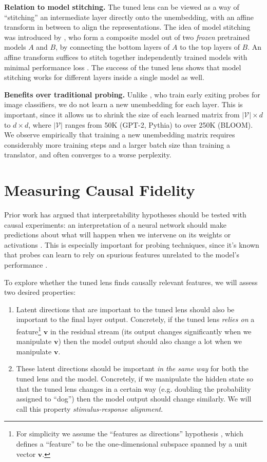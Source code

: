 \documentclass{article}
\theoremstyle{plain}
\theoremstyle{definition}
\newcommand{\vv}{\boldsymbol v} %
\begin{document}
\textbf{Relation to model stitching.}
The tuned lens can be viewed as a way of ``stitching'' an intermediate layer directly onto the unembedding, with an affine transform in between to align the representations. The idea of model stitching was introduced by \citet{lenc2015understanding}, who form a composite model out of two \emph{frozen} pretrained models $A$ and $B$, by connecting the bottom layers of $A$ to the top layers of $B$. An affine transform suffices to stitch together independently trained models with minimal performance loss \citep{bansal2021revisiting, csiszarik2021similarity}. The success of the tuned lens shows that model stitching works for different layers inside a single model as well.

\textbf{Benefits over traditional probing.}
Unlike \citet{alain2016understanding}, who train early exiting probes for image classifiers, we do not learn a new unembedding for each layer. This is important, since it allows us to shrink the size of each learned matrix from $|\mathcal{V}| \times d$ to $d \times d$, where $|\mathcal{V}|$ ranges from 50K (GPT-2, Pythia) to over 250K (BLOOM). We observe empirically that training a new unembedding matrix requires considerably more training steps and a larger batch size than training a translator, and often converges to a worse perplexity.

\section{Measuring Causal Fidelity}
\label{causal-fidelity}

Prior work has argued that interpretability hypotheses should be tested with causal experiments: an interpretation of a neural network should make predictions about what will happen when we intervene on its weights or activations \cite{olah2020zoom, chan2022causal}. This is especially important for probing techniques, since it's known that probes can learn to rely on spurious features unrelated to the model's performance \citep{hewitt2019designing, belinkov2022probing}.

To explore whether the tuned lens finds causally relevant features, we will assess two desired properties:
\begin{enumerate}
    \item Latent directions that are important to the tuned lens should also be important to the final layer output. Concretely, if the tuned lens \emph{relies on} a feature\footnote{For simplicity we assume the ``features as directions'' hypothesis \cite{elhage2022toy}, which defines a ``feature'' to be the one-dimensional subspace spanned by a unit vector $\vv$.} $\vv$ in the residual stream (its output changes significantly when we manipulate $\vv$) then the model output should also change a lot when we manipulate $\vv$.
    \item These latent directions should be important \emph{in the same way} for both the tuned lens and the model. Concretely, if we manipulate the hidden state so that the tuned lens changes in a certain way (e.g. doubling the probability assigned to ``dog'') then the model output should change similarly. We will call this property \emph{stimulus-response alignment}.
\end{enumerate}
\end{document}
